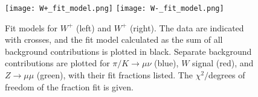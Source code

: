 \documentclass[a4paper]{article}
\begin{document}
\begin{figure}[h]
\centering
\texttt{[image: W+\_fit\_model.png]}
\texttt{[image: W-\_fit\_model.png]} 
\vspace{-4mm}
\caption{\small Fit models for $W^+$ (left) and $W^+$ (right). The data are indicated with crosses, and the fit model calculated as the sum of all background contributions is plotted in black. Separate background contributions are plotted for $\pi/K \xrightarrow{} \mu\nu$ (blue), $W$ signal (red), and $Z \xrightarrow{} \mu\mu$ (green), with their fit fractions listed. The $\chi^2/$degrees of freedom of the fraction fit is given.}
\label{fig: W fit model}
\end{figure}

{}

\end{document}
